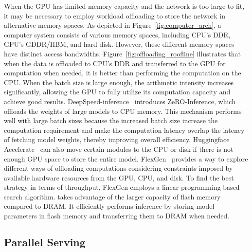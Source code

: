 When the GPU has limited memory capacity and the network is too large to fit, it may be necessary to employ workload offloading to store the network in alternative memory spaces.
As depicted in Figure~\ref{fig:computer_arch}, a computer system consists of various memory spaces, including CPU's DDR, GPU's GDDR/HBM, and hard disk. However, these different memory spaces have distinct access bandwidths.
Figure~\ref{fig:offloading_roofline} illustrates that when the data is offloaded to CPU's DDR and transferred to the GPU for computation when needed, it is better than performing the computation on the CPU. When the batch size is large enough, the arithmetic intensity increases significantly, allowing the GPU to fully utilize its computation capacity and achieve good results.
DeepSpeed-inference~\citep{aminabadi2022deepspeedinference} introduces ZeRO-Inference, which offloads the weights of large models to CPU memory.
This mechanism performs well with large batch sizes because the increased batch size increase the computation requirement and make the computation latency overlap the latency of fetching model weights, thereby improving overall efficiency.
Huggingface Accelerate~\citep{huggingface2022-accelerate} can also move certain modules to the CPU or disk if there is not enough GPU space to store the entire model.
FlexGen~\citep{sheng2023flexgen} provides a way to explore different ways of offloading computations considering constraints imposed by available hardware resources from the GPU, CPU, and disk. To find the best strategy in terms of throughput, FlexGen employs a linear programming-based search algorithm.
\citet{alizadeh2023llminflash} takes advantage of the larger capacity of flash memory compared to DRAM. It efficiently performs inference by storing model parameters in flash memory and transferring them to DRAM when needed.

\subsection{Parallel Serving}

